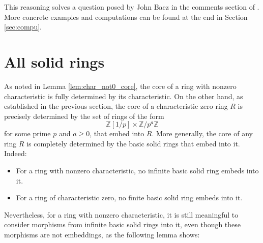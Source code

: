 \documentclass{amsart}
\newcommand{\Z}{{\mathbb Z}}
\begin{document}
    This reasoning solves a question posed by John Baez in the comments section of \cite{Bae21}.
    More concrete examples and computations can be found at the end in Section \ref{sec:compu}.

    \section{All solid rings}

    As noted in Lemma \ref{lem:char_not0_core}, the core of a ring with nonzero characteristic is fully determined by its characteristic.
    On the other hand, as established in the previous section, the core of a characteristic zero ring $R$ is precisely determined by the set of rings of the form
    $$
    \Z[1/p] \times \Z/p^a\Z
    $$
    for some prime $p$ and $a \geq 0$, that embed into $R$.
    More generally, the core of any ring $R$ is completely determined by the basic solid rings that embed into it.
    Indeed:
    \begin{itemize}
        \item
        For a ring with nonzero characteristic, no infinite basic solid ring embeds into it.

        \item 
        For a ring of characteristic zero, no finite basic solid ring embeds into it.
    \end{itemize}

    Nevertheless, for a ring with nonzero characteristic, it is still meaningful to consider morphisms from infinite basic solid rings into it, even though these morphisms are not embeddings, as the following lemma shows:
    
\end{document}
